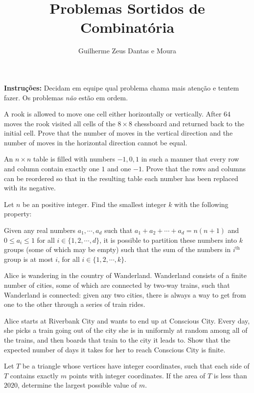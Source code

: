 \documentclass[11pt, a4paper]{article}
\title{Problemas Sortidos de Combinatória}
\author{Guilherme Zeus Dantas e Moura}
\begin{document}
	
	\zeustitle

	\noindent \textbf{Instruções:} Decidam em equipe qual problema chama mais atenção e tentem fazer. Os problemas \textit{não} estão em ordem.
	\vspace{1em}

	\begin{prob}
		A rook is allowed to move one cell either horizontally or vertically. After $64$ moves the rook visited all cells of the $8 \times 8$ chessboard and returned back to the initial cell. Prove that the number of moves in the vertical direction and the number of moves in the horizontal direction cannot be equal.
	\end{prob}
	\begin{prob}[Irã 1997-98]
		An $n\times n$ table is filled with numbers $-1, 0, 1$ in such a manner that every row and column contain exactly one $1$ and one $-1$. Prove that the rows and columns can be reordered so that in the resulting table each number has been replaced with its negative.
	\end{prob}
	\begin{prob}
		Let $n$ be an positive integer. Find the smallest integer $k$ with the following property:
		
		Given any real numbers $a_1 , \cdots , a_d $ such that $a_1 + a_2 + \cdots + a_d = n(n+1)$ and $0 \le a_i \le 1$ for all $i \in \{1,2,\cdots ,d\}$, it is possible to partition these numbers into $k$ groups (some of which may be empty) such that the sum of the numbers in $i^\mathrm{th}$ group is at most $i$, for all $i \in \{1,2,\cdots ,k\}$.
	\end{prob}
	\begin{prob} 
		Alice is wandering in the country of Wanderland. Wanderland consists of a finite number of cities, some of which are connected by two-way trains, such that Wanderland is connected: given any two cities, there is always a way to get from one to the other through a series of train rides.
    
Alice starts at Riverbank City and wants to end up at Conscious City. Every day, she picks a train going out of the city she is in uniformly at random among all of the trains, and then boards that train to the city it leads to. Show that the expected number of days it takes for her to reach Conscious City is finite.
	\end{prob}
	\begin{prob}
		Let $T$ be a triangle whose vertices have integer coordinates, such that each side of $T$ contains exactly $m$ points with integer coordinates. If the area of $T$ is less than $2020$, determine the largest possible value of $m$.
	\end{prob}
\end{document}

